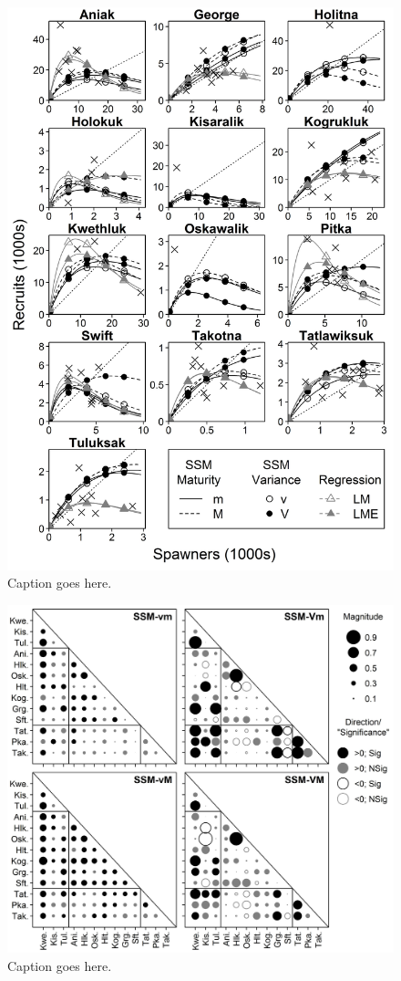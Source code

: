 \documentclass[12pt,]{book}
\theoremstyle{definition}
\theoremstyle{definition}
\theoremstyle{definition}
\theoremstyle{remark}
\begin{document}
\begin{figure}
  \centering
  \includegraphics{img/Ch4/R-v-S.jpg}
  \caption{Caption goes here.}
  \label{fig:r-v-s}
\end{figure}

\clearpage

\begin{figure}
  \centering
  \includegraphics{img/Ch4/rhos.jpg}
  \caption{Caption goes here.}
  \label{fig:rhos}
\end{figure}

\doublespacing

\setlength{\parskip}{6pt plus 2pt minus 1pt}


\end{document}
